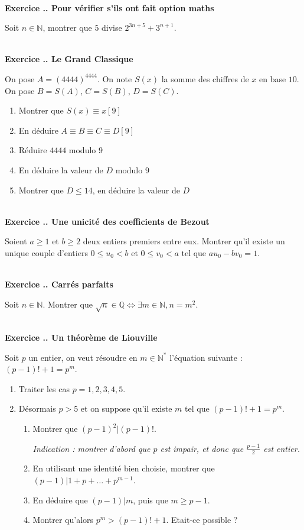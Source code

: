\documentclass{article}
\newcommand{\mb}[1]{\mathbb{#1}}
\newcounter{exo}
\newcommand{\exercice}[1][\null]{\textbf{\\ Exercice \thesection.\theexo. #1} \addtocounter{exo}{1}}
\begin{document}
\exercice[Pour vérifier s'ils ont fait option maths]

Soit $n \in \mb{N}$, montrer que $5$ divise $2^{3n+5} + 3^{n+1}$.

\exercice[Le Grand Classique]

On pose $A = (4444)^{4444}$. On note $S(x)$ la somme des chiffres 
de $x$ en base $10$. On pose $B = S(A)$, $C = S(B)$, $D = S(C)$.

\begin{enumerate}
    \item Montrer que $S(x) \equiv x [9]$
    \item En déduire $A \equiv B \equiv C \equiv D [9]$
    \item Réduire $4444$ modulo $9$
    \item En déduire la valeur de $D$ modulo $9$
    \item Montrer que $D \leq 14$, en déduire la valeur de $D$
\end{enumerate}


\exercice[Une unicité des coefficients de Bezout]

 Soient $a \ge 1$ et $ b \ge 2$ deux entiers premiers entre eux. Montrer qu'il existe un unique couple d'entiers $0 \le u_0 < b$ et $0 \le v_0 < a$ tel que $au_0 - b v_0 = 1$.
 
\exercice[Carrés parfaits]

Soit $n \in \mb{N}$. Montrer que $\sqrt{n} \in \mb{Q} \iff \exists m \in \mb{N}, n = m^2$.




\exercice[Un théorème de Liouville]

Soit $p$ un entier, on veut résoudre en $m \in \mb{N}^*$ l'équation suivante : $(p-1)! +1 = p^m$.

\begin{enumerate}

\item Traiter les cas $p = 1,2,3,4,5$.

\item Désormais $p > 5$ et on suppose qu'il existe $m$ tel que $(p-1)! +1 = p^m$.

\begin{enumerate}

\item Montrer que $(p-1)^2 | (p-1) !$.

\emph{Indication : montrer d'abord que $p$ est impair, et donc que $\frac{p-1}{2}$ est entier.}

\item En utilisant une identité bien choisie, montrer que $(p-1) | 1+ p + \dots + p^{m-1}$.

\item En déduire que $(p-1) | m$, puis que $m \ge p-1$.

\item Montrer qu'alors $p^m > (p-1)! +1$. Etait-ce possible ?

\end{enumerate}

\end{enumerate}
\end{document}
